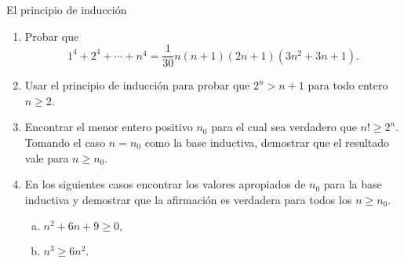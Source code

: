 \begin{section}{El principio de inducción}
\begin{enumerate}[1)]
\item Probar que
$$
1^4+2^4+\cdots+n^4= \frac{1}{30}n(n+1)(2n+1)(3n^2+3n+1).
$$
\item Usar el principio de inducción para probar que $2^n>n+1$ para todo
entero $n\ge2$.

\item Encontrar el menor entero positivo $n_0$ para el cual sea
verdadero que $n! \ge 2^n$. Tomando el caso $n=n_0$ como la base
inductiva, demostrar que el resultado vale para $n\ge n_0$.

\item En los siguientes casos encontrar los valores apropiados de $n_0$
para la base inductiva y demostrar que la afirmación es verdadera
para todos los $n\ge n_0$.
\begin{enumerate}[a)]
	\item $n^2 +6n + 9 \ge 0,$
	
	\item $n^3 \ge 6n^2.$
\end{enumerate}

\end{enumerate}
\end{section}

